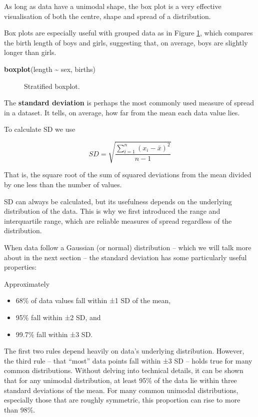 \documentclass[
]{book}
\makeatletter
\newenvironment{Shaded}{\begin{snugshade}}{\end{snugshade}}
\newcommand{\FunctionTok}[1]{\textcolor[rgb]{0.13,0.29,0.53}{\textbf{#1}}}
\newcommand{\NormalTok}[1]{#1}
\newcommand{\SpecialCharTok}[1]{\textcolor[rgb]{0.81,0.36,0.00}{\textbf{#1}}}
\newcommand*\pandocbounded[1]{%
  \sbox\pandoc@box{#1}%
  \Gscale@div\@tempa{\textheight}{\dimexpr\ht\pandoc@box+\dp\pandoc@box\relax}%
  \Gscale@div\@tempb{\linewidth}{\wd\pandoc@box}%
  \ifdim\@tempb\p@<\@tempa\p@\let\@tempa\@tempb\fi%
  \ifdim\@tempa\p@<\p@\scalebox{\@tempa}{\usebox\pandoc@box}%
  \else\usebox{\pandoc@box}%
  \fi%
}
\providecommand{\tightlist}{%
  \setlength{\itemsep}{0pt}\setlength{\parskip}{0pt}}
\makeatother
\begin{document}
As long as data have a unimodal shape, the box plot is a very effective visualisation of both the centre, shape and spread of a distribution.

Box plots are especially useful with grouped data as in Figure \ref{fig:stat-box2}, which compares the birth length of boys and girls, suggesting that, on average, boys are slightly longer than girls.

\begin{Shaded}
\begin{Highlighting}[]
\FunctionTok{boxplot}\NormalTok{(length }\SpecialCharTok{\textasciitilde{}}\NormalTok{ sex, births)}
\end{Highlighting}
\end{Shaded}

\begin{figure}
\centering
\pandocbounded{}
\caption{\label{fig:stat-box2}Stratified boxplot.}
\end{figure}

The \textbf{standard deviation} is perhaps the most commonly used measure of spread in a dataset. It tells, on average, how far from the mean each data value lies.

To calculate SD we use

\[
SD = \sqrt{\frac{\sum_{i=1}^{n}(x_i-\bar{x})^2}{n-1}}
\]

That is, the square root of the sum of squared deviations from the mean divided by one less than the number of values.

SD can always be calculated, but its usefulness depends on the underlying distribution of the data. This is why we first introduced the range and interquartile range, which are reliable measures of spread regardless of the distribution.

When data follow a Gaussian (or normal) distribution -- which we will talk more about in the next section -- the standard deviation has some particularly useful properties:

Approximately

\begin{itemize}
\tightlist
\item
  68\% of data values fall within ±1 SD of the mean,
\item
  95\% fall within ±2 SD, and
\item
  99.7\% fall within ±3 SD.
\end{itemize}

The first two rules depend heavily on data's underlying distribution. However, the third rule -- that ``most'' data points fall within ±3 SD -- holds true for many common distributions. Without delving into technical details, it can be shown that for any unimodal distribution, at least 95\% of the data lie within three standard deviations of the mean. For many common unimodal distributions, especially those that are roughly symmetric, this proportion can rise to more than 98\%.
\end{document}
